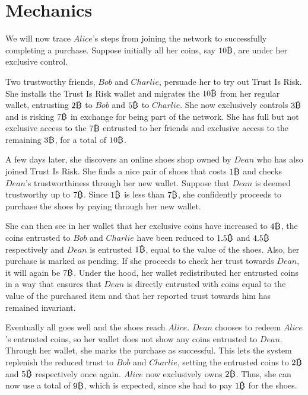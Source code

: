 \section{Mechanics}
  We will now trace $Alice$'s steps from joining the network to successfully completing a purchase. Suppose initially
  all her coins, say $10\bitcoin$, are under her exclusive control.

  Two trustworthy friends, $Bob$ and $Charlie$, persuade her to try out Trust Is Risk. She installs the Trust Is Risk
  wallet and migrates the $10\bitcoin$ from her regular wallet, entrusting $2\bitcoin$ to $Bob$ and $5\bitcoin$ to $Charlie$.
  She now exclusively controls $3\bitcoin$ and is risking $7\bitcoin$ in exchange for being part of the network. She has full
  but not exclusive access to the $7\bitcoin$ entrusted to her friends and exclusive access to the remaining $3\bitcoin$, for
  a total of $10\bitcoin$.

  A few days later, she discovers an online shoes shop owned by $Dean$ who has also joined Trust Is Risk. She finds a nice
  pair of shoes that costs $1\bitcoin$ and checks $Dean$'s trustworthiness through her new wallet. Suppose that $Dean$ is
  deemed trustworthy up to $7\bitcoin$. Since $1\bitcoin$ is less than $7\bitcoin$, she confidently proceeds to purchase the
  shoes by paying through her new wallet.

  She can then see in her wallet that her exclusive coins have increased to $4\bitcoin$, the coins entrusted to $Bob$ and
  $Charlie$ have been reduced to $1.5\bitcoin$ and $4.5\bitcoin$ respectively and $Dean$ is entrusted $1\bitcoin$, equal to
  the value of the shoes. Also, her purchase is marked as pending. If she proceeds to check her trust towards $Dean$, it will
  again be $7\bitcoin$. Under the hood, her wallet redistributed her entrusted coins in a way that ensures that $Dean$ is
  directly entrusted with coins equal to the value of the purchased item and that her reported trust towards him has remained
  invariant.

  Eventually all goes well and the shoes reach $Alice$. $Dean$ chooses to redeem $Alice$'s entrusted coins, so her wallet
  does not show any coins entrusted to $Dean$. Through her wallet, she marks the purchase as successful. This lets the system
  replenish the reduced trust to $Bob$ and $Charlie$, setting the entrusted coins to $2\bitcoin$ and $5\bitcoin$ respectively
  once again. $Alice$ now exclusively owns $2\bitcoin$. Thus, she can now use a total of $9\bitcoin$, which is expected,
  since she had to pay $1\bitcoin$ for the shoes.
